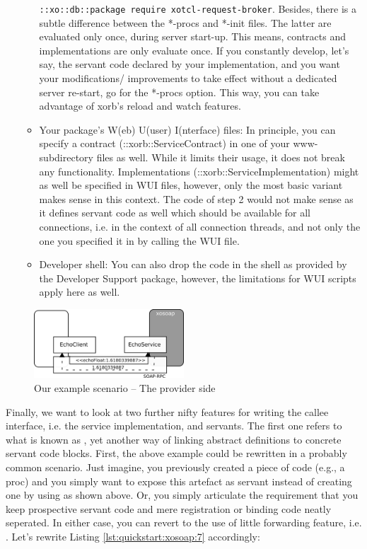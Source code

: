 \begin{enumerate}
\begin{itemize}
\lstinline[breaklines=true]!::xo::db::package require xotcl-request-broker!. Besides, there is a subtle difference between the *-procs and *-init files. The latter are evaluated only once, during server start-up. This means, contracts and implementations are only evaluate once. If you constantly develop, let's say, the servant code declared by your implementation, and you want your modifications/ improvements to take effect without a dedicated server re-start, go for the *-procs option. This way, you can take advantage of xorb's reload and watch features.
\item Your package's W(eb) U(user) I(nterface) files: In principle, you can specify a contract (::xorb::ServiceContract) in one of your www-subdirectory files as well. While it limits their usage, it does not break any functionality. Implementations (::xorb::ServiceImplementation) might as well be specified in WUI files, however, only the most basic variant makes sense in this context. The code of step 2 would not make sense as it defines servant code as well which should be available for all connections, i.e. in the context of all connection threads, and not only the one you specified it in by calling the WUI file.
\item Developer shell: You can also drop the code in the shell as provided by the Developer Support package, however, the limitations for WUI scripts apply here as well.
\end{itemize}

\end{enumerate}
  \begin{figure}[htbp]
\begin{center}
\includegraphics[width=0.5\textwidth]{img/provider.png}
\caption{Our example scenario -- The provider side}
\label{fig:quickstart:xosoap:2}
\end{center}
\end{figure}

Finally, we want to look at two further nifty features for writing the callee interface, i.e. the service implementation, and servants. The first one refers to what is known as , yet another way of linking abstract definitions to concrete servant code blocks. First, the above example could be rewritten in a probably common scenario. Just imagine, you previously created a piece of code (e.g., a proc) and you simply want to expose this artefact as servant instead of creating one by using  as shown above.
Or, you simply articulate the requirement that you keep prospective servant code and mere registration or binding code neatly seperated. In either case, you can revert to the use of little forwarding feature, i.e. . Let's rewrite Listing \ref{lst:quickstart:xosoap:7} accordingly:

